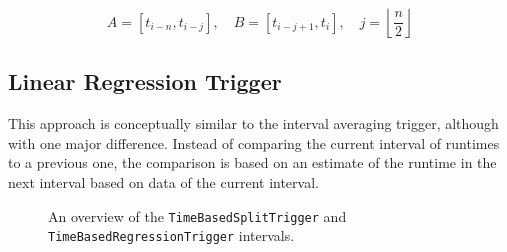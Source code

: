 \begin{equation}
	A = \left[t_{i-n}, t_{i-j}\right],\quad B=\left[t_{i-j+1},t_i\right],\quad j=\left\lfloor\frac{n}{2}\right\rfloor\label{eq:split_intervals}
\end{equation}

\subsection{Linear Regression Trigger}
This approach is conceptually similar to the interval averaging trigger, although with one major difference. Instead of comparing the current interval of runtimes to a previous one, the comparison is based on an estimate of the runtime in the next interval based on data of the current interval.

\begin{figure}[htpb]
	\centering
	\begin{tikzpicture}
	\end{tikzpicture}
	\caption{An overview of the \texttt{TimeBasedSplitTrigger} and \texttt{TimeBasedRegressionTrigger} intervals. }
\end{figure}


